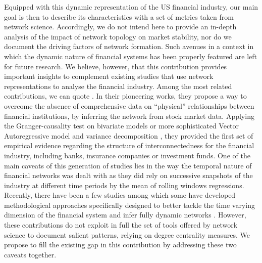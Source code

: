 \documentclass[a4paper,10pt]{article}
\begin{document}
Equipped with this dynamic representation of the US financial industry, our main goal is then to
describe its characteristics with a set of metrics taken from network science. Accordingly, we do not
intend here to provide an in-depth analysis of the impact of network topology on market stability, nor do we document the 
driving factors of network formation. Such avenues in a context in which the dynamic nature of financial systems has been 
properly featured are left for future research. We believe, however, that this contribution provides important insights to 
complement existing studies that use network representations to analyse the financial industry. Among the most related 
contributions, we can quote \cite{Billio,Diebold}. In their pioneering works, they propose a way to overcome the absence of 
comprehensive data on “physical” relationships between financial institutions, by inferring the network from stock market data.
Applying the Granger-causality test on bivariate models \cite{Billio} or more sophisticated Vector 
Autoregressive model and variance decomposition \cite{Diebold}, they provided the first set of empirical evidence regarding 
the structure of interconnectedness for the financial industry, including banks, insurance companies or investment funds. One
of the main caveats of this generation of studies lies in the way the temporal nature of financial networks was dealt with as
they did rely on successive snapshots of the industry at different time periods by the mean of rolling windows regressions. 
Recently, there have been a few studies among which \cite{Geraci,Billio2} some have developed methodological approaches 
specifically designed to better tackle the time varying dimension of the financial system and infer fully dynamic networks 
\cite{Geraci,Billio2}. However, these contributions do not exploit in full the set of tools offered by network science to 
document salient patterns, relying on degree centrality measures. We propose to fill the existing gap in this contribution by
addressing these two caveats together.
\end{document}
